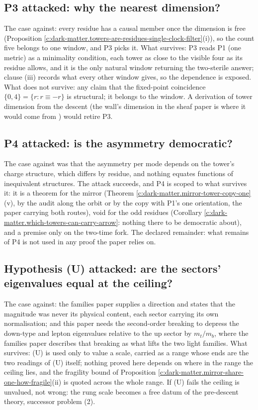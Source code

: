 \documentclass[11pt]{article}
\theoremstyle{definition}
\theoremstyle{plain}
\begin{document}
\subsection*{P3 attacked: why the nearest dimension?}
\label{c:note.dark-matter.setting-p3-attacked-why-nearest-dimension}
The case against: every residue has a causal member once the dimension is free (Proposition \ref{c:dark-matter.towers-are-residues-single-clock-filter}(i)), so the count five belongs to one window, and P3 picks it. What survives: P3 reads P1 (one metric) as a minimality condition, each tower as close to the visible four as its residue allows, and it is the only natural window returning the two-sterile answer; clause (iii) records what every other window gives, so the dependence is exposed. What does not survive: any claim that the fixed-point coincidence $\{0, 4\} = \{r : r \equiv -r\}$ is structural; it belongs to the window. A derivation of tower dimension from the descent (the wall's dimension in the sheaf paper is where it would come from \cite{ButlerT4}) would retire P3.

\subsection*{P4 attacked: is the asymmetry democratic?}
\label{c:note.dark-matter.setting-p4-attacked-asymmetry-democratic}
The case against was that the asymmetry per mode depends on the tower's charge structure, which differs by residue, and nothing equates functions of inequivalent structures. The attack succeeds, and P4 is scoped to what survives it: it is a theorem for the mirror (Theorem \ref{c:dark-matter.mirror-tower-copy-one}(v), by the audit along the orbit or by the copy with P1's one orientation, the paper carrying both routes), void for the odd residues (Corollary \ref{c:dark-matter.which-towers-can-carry-arrow}: nothing there to be democratic about), and a premise only on the two-time fork. The declared remainder: what remains of P4 is not used in any proof the paper relies on.

\subsection*{Hypothesis (U) attacked: are the sectors' eigenvalues equal at the ceiling?}
\label{c:note.dark-matter.setting-hypothesis-u-attacked-are-sectors}
The case against: the families paper supplies a direction and states that the magnitude was never its physical content, each sector carrying its own normalisation; and this paper needs the second-order breaking to depress the down-type and lepton eigenvalues relative to the up sector by $m_{t}/m_{b}$, where the families paper describes that breaking as what lifts the two light families. What survives: (U) is used only to value a scale, carried as a range whose ends are the two readings of (U) itself; nothing proved here depends on where in the range the ceiling lies, and the fragility bound of Proposition \ref{c:dark-matter.mirror-share-one-how-fragile}(ii) is quoted across the whole range. If (U) fails the ceiling is unvalued, not wrong: the rung scale becomes a free datum of the pre-descent theory, successor problem (2).
\end{document}
